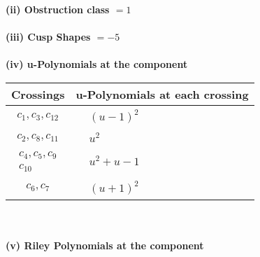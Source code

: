 \documentclass[1p]{elsarticle_modified}
\theoremstyle{definition}
\begin{document}
\flushleft \textbf{(ii) Obstruction class $= 1$}\\~\\
\flushleft \textbf{(iii) Cusp Shapes $= -5$}\\~\\
\newpage\renewcommand{\arraystretch}{1}
\flushleft \textbf{(iv) u-Polynomials at the component}\newline \\
\begin{tabular}{m{50pt}|m{274pt}}
Crossings & \hspace{64pt}u-Polynomials at each crossing \\
\hline $$\begin{aligned}c_{1},c_{3},c_{12}\end{aligned}$$&$\begin{aligned}
&(u-1)^2
\end{aligned}$\\
\hline $$\begin{aligned}c_{2},c_{8},c_{11}\end{aligned}$$&$\begin{aligned}
&u^2
\end{aligned}$\\
\hline $$\begin{aligned}c_{4},c_{5},c_{9}\\c_{10}\end{aligned}$$&$\begin{aligned}
&u^2+u-1
\end{aligned}$\\
\hline $$\begin{aligned}c_{6},c_{7}\end{aligned}$$&$\begin{aligned}
&(u+1)^2
\end{aligned}$\\
\hline
\end{tabular}\\~\\
\newpage\renewcommand{\arraystretch}{1}
\flushleft \textbf{(v) Riley Polynomials at the component}\newline \\
\end{document}
